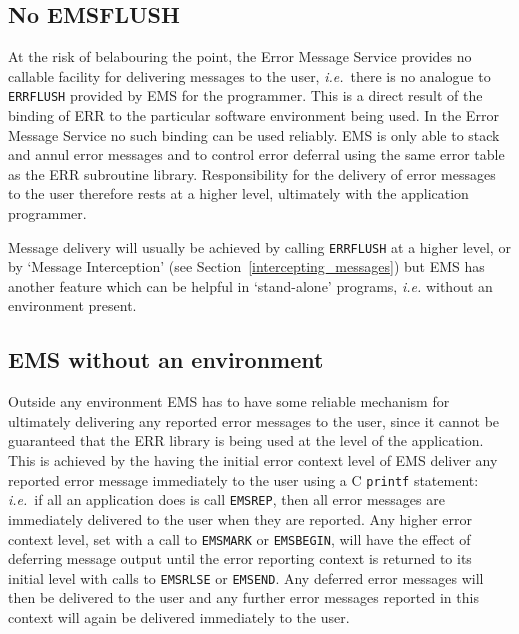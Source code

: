 \documentclass[twoside,11pt]{article}
\newcommand{\htmlref}[2]{#1}
\newcommand{\latex}[1]{#1}
\newcommand{\xref}[3]{#1}
\newcommand{\xlabel}[1]{}
\renewcommand{\_}{\texttt{\symbol{95}}}
\begin{document}
\subsection{\xlabel{no_ems_flush}No EMS\_FLUSH}
At the risk of belabouring the point, the Error Message Service provides no 
callable facility for delivering messages to the user, \textit{i.e.}\ there is 
no analogue to 
\xref{\texttt{ERR\_FLUSH}}{sun104}{ERR_FLUSH}
provided by EMS for the programmer.
This is a direct result of the binding of ERR to the particular 
software environment being used.
In the Error Message Service no such binding can be used reliably.
EMS is only able to stack and annul error messages and to
control error deferral using the same error table as the ERR subroutine
library. 
Responsibility for the delivery of error messages to the user therefore rests
at a higher level, ultimately with the application programmer.

Message delivery will usually be achieved by calling \texttt{ERR\_FLUSH} at a
higher level, or by
\htmlref{`Message Interception'}{intercepting_messages}\latex{ (see
Section~\ref{intercepting_messages})} but EMS has another feature which can be
helpful in `stand-alone' programs, \textit{i.e.} without an environment
present.

\subsection{\xlabel{ems_without_an_environment}EMS without an environment}
Outside any environment EMS has to have some reliable mechanism for ultimately
delivering any reported error messages to the user, since it cannot be
guaranteed that the ERR library is being used at the level of the application.
This is achieved by the having the initial error context level of EMS deliver 
any reported error message immediately to the user using a C \texttt{printf}
statement: \textit{i.e.}\ if all an application does is call \texttt{EMS\_REP},
then all error messages are immediately delivered to the user when they are
reported.
Any higher error context level, set with a call to \texttt{EMS\_MARK} or
\texttt{EMS\_BEGIN},
will have the effect of deferring message output until the error reporting 
context is returned to its initial level with calls to \texttt{EMS\_RLSE} 
or \texttt{EMS\_END}.
Any deferred error messages will then be delivered to the user and any further
error messages reported in this context will again be delivered immediately to
the user.
\end{document}
